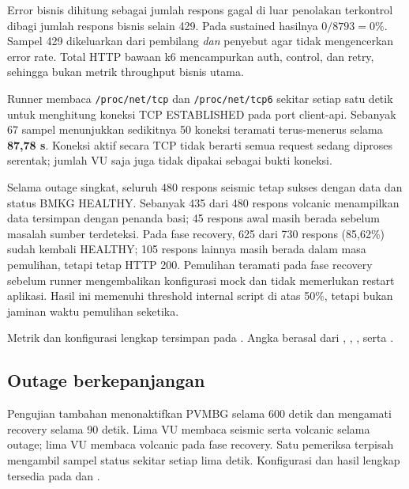Error bisnis dihitung sebagai jumlah respons gagal di luar penolakan terkontrol dibagi jumlah respons bisnis selain 429. Pada sustained hasilnya $0/8793=0\%$. Sampel 429 dikeluarkan dari pembilang \emph{dan} penyebut agar tidak mengencerkan error rate. Total HTTP bawaan k6 mencampurkan auth, control, dan retry, sehingga bukan metrik throughput bisnis utama.


Runner membaca \nolinkurl{/proc/net/tcp} dan \nolinkurl{/proc/net/tcp6} sekitar setiap satu detik untuk menghitung koneksi TCP ESTABLISHED pada port client-api. Sebanyak 67 sampel menunjukkan sedikitnya 50 koneksi teramati terus-menerus selama \textbf{87,78 s}. Koneksi aktif secara TCP tidak berarti semua request sedang diproses serentak; jumlah VU saja juga tidak dipakai sebagai bukti koneksi.

Selama outage singkat, seluruh 480 respons seismic tetap sukses dengan data dan status BMKG HEALTHY. Sebanyak 435 dari 480 respons volcanic menampilkan data tersimpan dengan penanda basi; 45 respons awal masih berada sebelum masalah sumber terdeteksi. Pada fase recovery, 625 dari 730 respons (85,62\%) sudah kembali HEALTHY; 105 respons lainnya masih berada dalam masa pemulihan, tetapi tetap HTTP 200. Pemulihan teramati pada fase recovery sebelum runner mengembalikan konfigurasi mock dan tidak memerlukan restart aplikasi. Hasil ini memenuhi threshold internal script di atas 50\%, tetapi bukan jaminan waktu pemulihan seketika.

Metrik dan konfigurasi lengkap tersimpan pada . Angka berasal dari , , , serta .

\subsection{Outage berkepanjangan}
Pengujian tambahan menonaktifkan PVMBG selama 600 detik dan mengamati recovery selama 90 detik. Lima VU membaca seismic serta volcanic selama outage; lima VU membaca volcanic pada fase recovery. Satu pemeriksa terpisah mengambil sampel status sekitar setiap lima detik. Konfigurasi dan hasil lengkap tersedia pada  dan .

